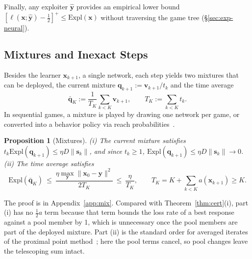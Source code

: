 \documentclass{article}
\theoremstyle{plain}
\newtheorem{proposition}[theorem]{Proposition}
\theoremstyle{remark}
\newcommand{\Expl}{\mathrm{Expl}}
\newcommand{\bx}{{\bm{x}}}
\newcommand{\by}{{\bm{y}}}
\newcommand{\bv}{{\bm{v}}}
\newcommand{\bq}{{\bm{q}}}
\newcommand{\dx}{{\bm{s}}}
\begin{document}
Finally, any exploiter $\hat\by$ provides an empirical lower bound $[\ell(\bx;\hat\by)-\tfrac12]^+\le\Expl(\bx)$ without traversing the game tree (\S\ref{sec:exp-neural}).

\subsection{Mixtures and Inexact Steps}
\label{sec:inexact}

Besides the learner $\bx_{k+1}$, a single network, each step yields two mixtures that can be deployed, the current mixture $\bq_{k+1}:=\bv_{k+1}/t_k$ and the time average
\[
\bar{\bq}_K:=\frac1{T_K}\sum_{k<K}\bv_{k+1},\qquad T_K:=\sum_{k<K}t_k .
\]
In sequential games, a mixture is played by drawing one network per game, or converted into a behavior policy via reach probabilities~\citep{kuhn1953}.
\begin{proposition}[Mixtures]
\label{prop:mix}
(i) The current mixture satisfies $t_k\Expl(\bq_{k+1})\le\eta D\|\dx_k\|$, and since $t_k\ge1$, $\Expl(\bq_{k+1})\le\eta D\|\dx_k\|\to0$.\\
(ii) The time average satisfies
\[
\Expl(\bar{\bq}_K)\ \le\ \frac{\eta\max_\by\|\bx_0-\by\|^2}{2T_K}\ \le\ \frac{\eta}{T_K},\qquad T_K=K+\textstyle\sum_{k<K}a(\bx_{k+1})\ge K.
\]
\end{proposition}
The proof is in Appendix~\ref{app:mix}. Compared with Theorem~\ref{thm:cert}(i), part (i) has no $\tfrac12a$ term because that term bounds the loss rate of a best response against a pool member by 1, which is unnecessary once the pool members are part of the deployed mixture. Part (ii) is the standard order for averaged iterates of the proximal point method~\citep{rockafellar1976ppa,nemirovski2004prox}; here the pool terms cancel, so pool changes leave the telescoping sum intact.
\end{document}
